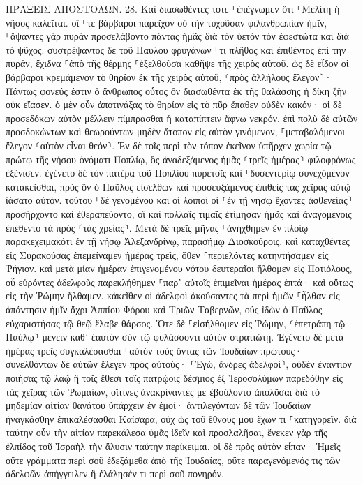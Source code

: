 \documentclass[twoside, 9pt]{extreport}
\begin{document}
ΠΡΑΞΕΙΣ ΑΠΟΣΤΟΛΩΝ.
28.
Καὶ διασωθέντες τότε ⸀ἐπέγνωμεν ὅτι ⸀Μελίτη ἡ νῆσος καλεῖται. 
οἵ ⸀τε βάρβαροι παρεῖχον οὐ τὴν τυχοῦσαν φιλανθρωπίαν ἡμῖν, ⸀ἅψαντες γὰρ πυρὰν προσελάβοντο πάντας ἡμᾶς διὰ τὸν ὑετὸν τὸν ἐφεστῶτα καὶ διὰ τὸ ψῦχος. 
συστρέψαντος δὲ τοῦ Παύλου φρυγάνων ⸀τι πλῆθος καὶ ἐπιθέντος ἐπὶ τὴν πυράν, ἔχιδνα ⸀ἀπὸ τῆς θέρμης ⸀ἐξελθοῦσα καθῆψε τῆς χειρὸς αὐτοῦ. 
ὡς δὲ εἶδον οἱ βάρβαροι κρεμάμενον τὸ θηρίον ἐκ τῆς χειρὸς αὐτοῦ, ⸂πρὸς ἀλλήλους ἔλεγον⸃· Πάντως φονεύς ἐστιν ὁ ἄνθρωπος οὗτος ὃν διασωθέντα ἐκ τῆς θαλάσσης ἡ δίκη ζῆν οὐκ εἴασεν. 
ὁ μὲν οὖν ἀποτινάξας τὸ θηρίον εἰς τὸ πῦρ ἔπαθεν οὐδὲν κακόν· 
οἱ δὲ προσεδόκων αὐτὸν μέλλειν πίμπρασθαι ἢ καταπίπτειν ἄφνω νεκρόν. ἐπὶ πολὺ δὲ αὐτῶν προσδοκώντων καὶ θεωρούντων μηδὲν ἄτοπον εἰς αὐτὸν γινόμενον, ⸀μεταβαλόμενοι ἔλεγον ⸂αὐτὸν εἶναι θεόν⸃. 
Ἐν δὲ τοῖς περὶ τὸν τόπον ἐκεῖνον ὑπῆρχεν χωρία τῷ πρώτῳ τῆς νήσου ὀνόματι Ποπλίῳ, ὃς ἀναδεξάμενος ἡμᾶς ⸂τρεῖς ἡμέρας⸃ φιλοφρόνως ἐξένισεν. 
ἐγένετο δὲ τὸν πατέρα τοῦ Ποπλίου πυρετοῖς καὶ ⸀δυσεντερίῳ συνεχόμενον κατακεῖσθαι, πρὸς ὃν ὁ Παῦλος εἰσελθὼν καὶ προσευξάμενος ἐπιθεὶς τὰς χεῖρας αὐτῷ ἰάσατο αὐτόν. 
τούτου ⸀δὲ γενομένου καὶ οἱ λοιποὶ οἱ ⸂ἐν τῇ νήσῳ ἔχοντες ἀσθενείας⸃ προσήρχοντο καὶ ἐθεραπεύοντο, 
οἳ καὶ πολλαῖς τιμαῖς ἐτίμησαν ἡμᾶς καὶ ἀναγομένοις ἐπέθεντο τὰ πρὸς ⸂τὰς χρείας⸃. 
Μετὰ δὲ τρεῖς μῆνας ⸀ἀνήχθημεν ἐν πλοίῳ παρακεχειμακότι ἐν τῇ νήσῳ Ἀλεξανδρίνῳ, παρασήμῳ Διοσκούροις. 
καὶ καταχθέντες εἰς Συρακούσας ἐπεμείναμεν ἡμέρας τρεῖς, 
ὅθεν ⸀περιελόντες κατηντήσαμεν εἰς Ῥήγιον. καὶ μετὰ μίαν ἡμέραν ἐπιγενομένου νότου δευτεραῖοι ἤλθομεν εἰς Ποτιόλους, 
οὗ εὑρόντες ἀδελφοὺς παρεκλήθημεν ⸀παρ᾽ αὐτοῖς ἐπιμεῖναι ἡμέρας ἑπτά· καὶ οὕτως εἰς τὴν Ῥώμην ἤλθαμεν. 
κἀκεῖθεν οἱ ἀδελφοὶ ἀκούσαντες τὰ περὶ ἡμῶν ⸀ἦλθαν εἰς ἀπάντησιν ἡμῖν ἄχρι Ἀππίου Φόρου καὶ Τριῶν Ταβερνῶν, οὓς ἰδὼν ὁ Παῦλος εὐχαριστήσας τῷ θεῷ ἔλαβε θάρσος. 
Ὅτε δὲ ⸀εἰσήλθομεν εἰς Ῥώμην, ⸂ἐπετράπη τῷ Παύλῳ⸃ μένειν καθ᾽ ἑαυτὸν σὺν τῷ φυλάσσοντι αὐτὸν στρατιώτῃ. 
Ἐγένετο δὲ μετὰ ἡμέρας τρεῖς συγκαλέσασθαι ⸀αὐτὸν τοὺς ὄντας τῶν Ἰουδαίων πρώτους· συνελθόντων δὲ αὐτῶν ἔλεγεν πρὸς αὐτούς· ⸂Ἐγώ, ἄνδρες ἀδελφοί⸃, οὐδὲν ἐναντίον ποιήσας τῷ λαῷ ἢ τοῖς ἔθεσι τοῖς πατρῴοις δέσμιος ἐξ Ἱεροσολύμων παρεδόθην εἰς τὰς χεῖρας τῶν Ῥωμαίων, 
οἵτινες ἀνακρίναντές με ἐβούλοντο ἀπολῦσαι διὰ τὸ μηδεμίαν αἰτίαν θανάτου ὑπάρχειν ἐν ἐμοί· 
ἀντιλεγόντων δὲ τῶν Ἰουδαίων ἠναγκάσθην ἐπικαλέσασθαι Καίσαρα, οὐχ ὡς τοῦ ἔθνους μου ἔχων τι ⸀κατηγορεῖν. 
διὰ ταύτην οὖν τὴν αἰτίαν παρεκάλεσα ὑμᾶς ἰδεῖν καὶ προσλαλῆσαι, ἕνεκεν γὰρ τῆς ἐλπίδος τοῦ Ἰσραὴλ τὴν ἅλυσιν ταύτην περίκειμαι. 
οἱ δὲ πρὸς αὐτὸν εἶπαν· Ἡμεῖς οὔτε γράμματα περὶ σοῦ ἐδεξάμεθα ἀπὸ τῆς Ἰουδαίας, οὔτε παραγενόμενός τις τῶν ἀδελφῶν ἀπήγγειλεν ἢ ἐλάλησέν τι περὶ σοῦ πονηρόν. 
\end{document}
